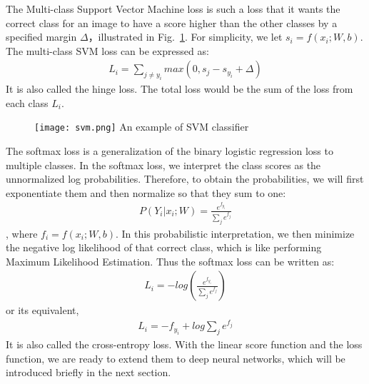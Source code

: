 The Multi-class Support Vector Machine loss is such a loss that it wants the correct class for an image to have a score higher than the other classes by a specified margin $\Delta$，illustrated in Fig.~\ref{fig:svm}. For simplicity, we let $s_i = f(x_i; W, b)$. The multi-class SVM loss can be expressed as:
\begin{align}L_i = \sum_{j\neq y_i} max(0, s_j - s_{y_i} + \Delta)\end{align}
It is also called the hinge loss. The total loss would be the sum of the loss from each class $L_i$.
\begin{figure}[!htp]
	\centering
	\texttt{[image: svm.png]}
	{An example of SVM classifier}
	\label{fig:svm}
\end{figure}
The softmax loss is a generalization of the binary logistic regression loss to multiple classes. In the softmax loss, we interpret the class scores as the unnormalized log probabilities. Therefore, to obtain the probabilities, we will first exponentiate them and then normalize so that they sum to one: 
\begin{align}
P(Y_i|x_i;W) = \frac{e^{f_{y_i}}}{\sum_j e^{f_j}}
\end{align}, where $f_i = f(x_i; W, b)$.
In this probabilistic interpretation, we then minimize the negative log likelihood of that correct class, which is like performing Maximum Likelihood Estimation. Thus the softmax loss can be written as:
\begin{align}L_i = -log\left( \frac{e^{f_{y_i}}}{\sum_j e^{f_j}}\right)\end{align}
or its equivalent,
\begin{align} L_i = -f_{y_i} + log \sum_j e^{f_j}\end{align}
It is also called the cross-entropy loss. With the linear score function and the loss function, we are ready to extend them to deep neural networks, which will be introduced briefly in the next section.



